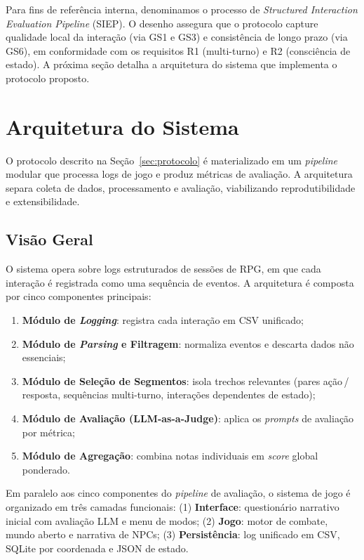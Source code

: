 \documentclass[12pt]{article}
\begin{document}
Para fins de referência interna, denominamos o processo de \textit{Structured Interaction Evaluation Pipeline} (SIEP). O desenho assegura que o protocolo capture qualidade local da interação (via GS1 e GS3) e consistência de longo prazo (via GS6), em conformidade com os requisitos R1 (multi-turno) e R2 (consciência de estado). A próxima seção detalha a arquitetura do sistema que implementa o protocolo proposto.

\section{Arquitetura do Sistema}
\label{sec:arquitetura}

O protocolo descrito na Seção~\ref{sec:protocolo} é materializado em um \textit{pipeline} modular que processa logs de jogo e produz métricas de avaliação. A arquitetura separa coleta de dados, processamento e avaliação, viabilizando reprodutibilidade e extensibilidade.

\subsection{Visão Geral}

O sistema opera sobre logs estruturados de sessões de RPG, em que cada interação é registrada como uma sequência de eventos. A arquitetura é composta por cinco componentes principais:

\begin{enumerate}[leftmargin=2.4em]
  \item \textbf{Módulo de \textit{Logging}}: registra cada interação em CSV unificado;
  \item \textbf{Módulo de \textit{Parsing} e Filtragem}: normaliza eventos e descarta dados não essenciais;
  \item \textbf{Módulo de Seleção de Segmentos}: isola trechos relevantes (pares ação\,/\,resposta, sequências multi-turno, interações dependentes de estado);
  \item \textbf{Módulo de Avaliação (LLM-as-a-Judge)}: aplica os \textit{prompts} de avaliação por métrica;
  \item \textbf{Módulo de Agregação}: combina notas individuais em \textit{score} global ponderado.
\end{enumerate}

Em paralelo aos cinco componentes do \textit{pipeline} de avaliação, o sistema de jogo é organizado em três camadas funcionais: (1) \textbf{Interface}: questionário narrativo inicial com avaliação LLM e menu de modos; (2) \textbf{Jogo}: motor de combate, mundo aberto e narrativa de NPCs; (3) \textbf{Persistência}: log unificado em CSV, SQLite por coordenada e JSON de estado.
\end{document}
